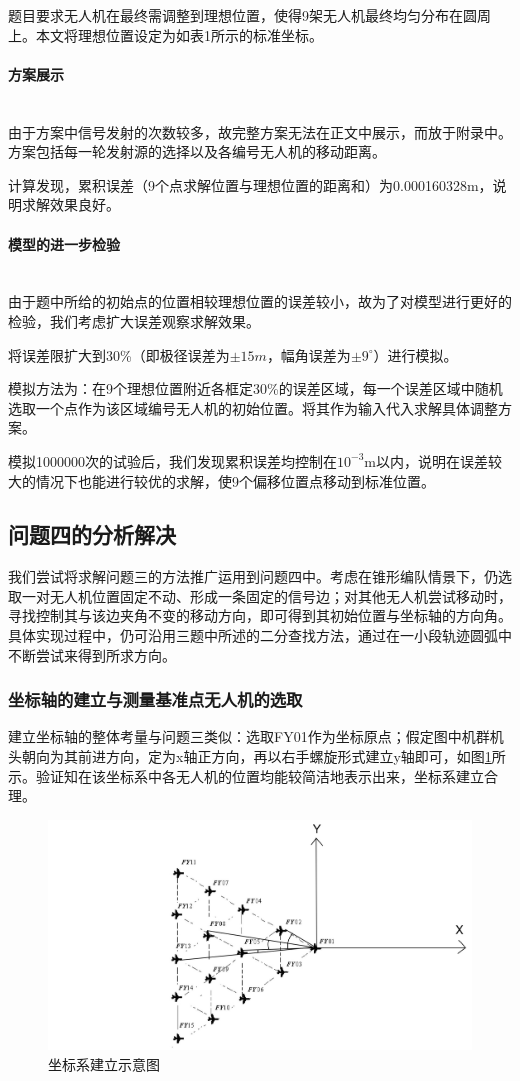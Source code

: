 \documentclass{ctexart}
\newcommand{\subsubsubsection}[1]{\paragraph{#1}\mbox{}\\}
\begin{document}
题目要求无人机在最终需调整到理想位置，使得9架无人机最终均匀分布在圆周上。本文将理想位置设定为如表1所示的标准坐标。
\subsubsubsection{方案展示}

由于方案中信号发射的次数较多，故完整方案无法在正文中展示，而放于附录中。方案包括每一轮发射源的选择以及各编号无人机的移动距离。

计算发现，累积误差（9个点求解位置与理想位置的距离和）为0.000160328m，说明求解效果良好。

\subsubsubsection{模型的进一步检验}

由于题中所给的初始点的位置相较理想位置的误差较小，故为了对模型进行更好的检验，我们考虑扩大误差观察求解效果。

将误差限扩大到30\%（即极径误差为$\pm 15m $，幅角误差为$\pm 9^{\circ}$）进行模拟。

模拟方法为：在9个理想位置附近各框定30\%的误差区域，每一个误差区域中随机选取一个点作为该区域编号无人机的初始位置。将其作为输入代入求解具体调整方案。

模拟1000000次的试验后，我们发现累积误差均控制在$10^{-3}$m以内，说明在误差较大的情况下也能进行较优的求解，使9个偏移位置点移动到标准位置。

\subsection{问题四的分析解决}
我们尝试将求解问题三的方法推广运用到问题四中。考虑在锥形编队情景下，仍选取一对无人机位置固定不动、形成一条固定的信号边；对其他无人机尝试移动时，寻找控制其与该边夹角不变的移动方向，即可得到其初始位置与坐标轴的方向角。具体实现过程中，仍可沿用三题中所述的二分查找方法，通过在一小段轨迹圆弧中不断尝试来得到所求方向。

\subsubsection{坐标轴的建立与测量基准点无人机的选取} 

建立坐标轴的整体考量与问题三类似：选取FY01作为坐标原点；假定图中机群机头朝向为其前进方向，定为x轴正方向，再以右手螺旋形式建立y轴即可，如图\ref{坐标系建立示意图}所示。验证知在该坐标系中各无人机的位置均能较简洁地表示出来，坐标系建立合理。

\begin{figure}[H]
  \centering
  \includegraphics[width=0.55\linewidth]{pic/share.jpg}
  \caption{坐标系建立示意图}
  \label{坐标系建立示意图}
  \end{figure}
\end{document}
